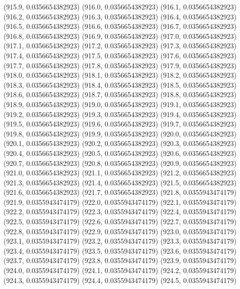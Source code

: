 {					(915.9, 0.0356654382923)
					(916.0, 0.0356654382923)
					(916.1, 0.0356654382923)
					(916.2, 0.0356654382923)
					(916.3, 0.0356654382923)
					(916.4, 0.0356654382923)
					(916.5, 0.0356654382923)
					(916.6, 0.0356654382923)
					(916.7, 0.0356654382923)
					(916.8, 0.0356654382923)
					(916.9, 0.0356654382923)
					(917.0, 0.0356654382923)
					(917.1, 0.0356654382923)
					(917.2, 0.0356654382923)
					(917.3, 0.0356654382923)
					(917.4, 0.0356654382923)
					(917.5, 0.0356654382923)
					(917.6, 0.0356654382923)
					(917.7, 0.0356654382923)
					(917.8, 0.0356654382923)
					(917.9, 0.0356654382923)
					(918.0, 0.0356654382923)
					(918.1, 0.0356654382923)
					(918.2, 0.0356654382923)
					(918.3, 0.0356654382923)
					(918.4, 0.0356654382923)
					(918.5, 0.0356654382923)
					(918.6, 0.0356654382923)
					(918.7, 0.0356654382923)
					(918.8, 0.0356654382923)
					(918.9, 0.0356654382923)
					(919.0, 0.0356654382923)
					(919.1, 0.0356654382923)
					(919.2, 0.0356654382923)
					(919.3, 0.0356654382923)
					(919.4, 0.0356654382923)
					(919.5, 0.0356654382923)
					(919.6, 0.0356654382923)
					(919.7, 0.0356654382923)
					(919.8, 0.0356654382923)
					(919.9, 0.0356654382923)
					(920.0, 0.0356654382923)
					(920.1, 0.0356654382923)
					(920.2, 0.0356654382923)
					(920.3, 0.0356654382923)
					(920.4, 0.0356654382923)
					(920.5, 0.0356654382923)
					(920.6, 0.0356654382923)
					(920.7, 0.0356654382923)
					(920.8, 0.0356654382923)
					(920.9, 0.0356654382923)
					(921.0, 0.0356654382923)
					(921.1, 0.0356654382923)
					(921.2, 0.0356654382923)
					(921.3, 0.0356654382923)
					(921.4, 0.0356654382923)
					(921.5, 0.0356654382923)
					(921.6, 0.0356654382923)
					(921.7, 0.0356654382923)
					(921.8, 0.0355943474179)
					(921.9, 0.0355943474179)
					(922.0, 0.0355943474179)
					(922.1, 0.0355943474179)
					(922.2, 0.0355943474179)
					(922.3, 0.0355943474179)
					(922.4, 0.0355943474179)
					(922.5, 0.0355943474179)
					(922.6, 0.0355943474179)
					(922.7, 0.0355943474179)
					(922.8, 0.0355943474179)
					(922.9, 0.0355943474179)
					(923.0, 0.0355943474179)
					(923.1, 0.0355943474179)
					(923.2, 0.0355943474179)
					(923.3, 0.0355943474179)
					(923.4, 0.0355943474179)
					(923.5, 0.0355943474179)
					(923.6, 0.0355943474179)
					(923.7, 0.0355943474179)
					(923.8, 0.0355943474179)
					(923.9, 0.0355943474179)
					(924.0, 0.0355943474179)
					(924.1, 0.0355943474179)
					(924.2, 0.0355943474179)
					(924.3, 0.0355943474179)
					(924.4, 0.0355943474179)
					(924.5, 0.0355943474179)
}
